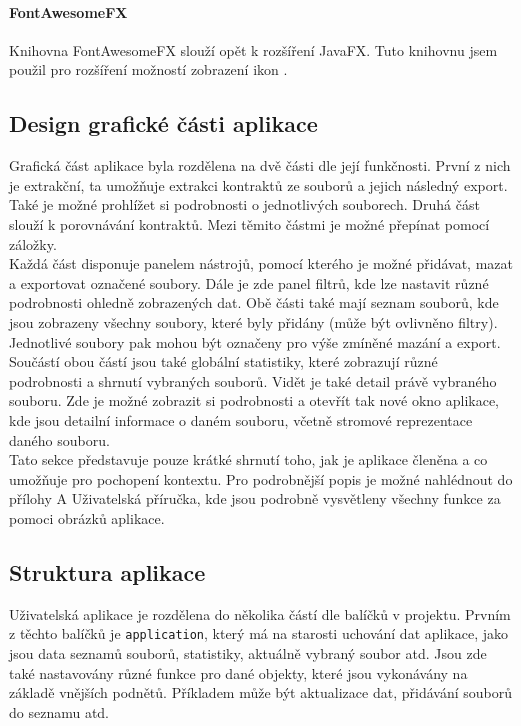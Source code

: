 			\paragraph{FontAwesomeFX} 	
				Knihovna FontAwesomeFX slouží opět k rozšíření JavaFX. Tuto knihovnu jsem použil pro rozšíření možností zobrazení ikon \cite{fontawesomefx}.	 
		
		\subsection{Design grafické části aplikace}
			Grafická část aplikace byla rozdělena na dvě části dle její funkčnosti. První z nich je extrakční, ta umožňuje extrakci kontraktů ze souborů a jejich následný export. Také je možné prohlížet si podrobnosti o jednotlivých souborech.  Druhá část slouží k porovnávání kontraktů. Mezi těmito částmi je možné přepínat pomocí záložky.\\
			
			Každá část disponuje panelem nástrojů, pomocí kterého je možné přidávat, mazat a exportovat označené soubory. Dále je zde panel filtrů, kde lze nastavit různé podrobnosti ohledně zobrazených dat. Obě části také mají seznam souborů, kde jsou zobrazeny všechny soubory, které byly přidány (může být ovlivněno filtry). Jednotlivé soubory pak mohou být označeny pro výše zmíněné mazání a export. Součástí obou částí jsou také globální statistiky, které zobrazují různé podrobnosti a shrnutí vybraných souborů. Vidět je také detail právě vybraného souboru. Zde je možné zobrazit si podrobnosti a otevřít tak nové okno aplikace, kde jsou detailní informace o daném souboru, včetně stromové reprezentace daného souboru.\\
			
			Tato sekce představuje pouze krátké shrnutí toho, jak je aplikace členěna a co umožňuje pro pochopení kontextu. Pro podrobnější popis je možné nahlédnout do přílohy A Uživatelská příručka, kde jsou podrobně vysvětleny všechny funkce za pomoci obrázků aplikace.
		
		\subsection{Struktura aplikace}
			Uživatelská aplikace je rozdělena do několika částí dle balíčků v projektu. Prvním z těchto balíčků je \texttt{application}, který má na starosti uchování dat aplikace, jako jsou data seznamů souborů, statistiky, aktuálně vybraný soubor atd. Jsou zde také nastavovány různé funkce pro dané objekty, které jsou vykonávány na základě vnějších podnětů. Příkladem může být aktualizace dat, přidávání souborů do seznamu atd.\\
			
